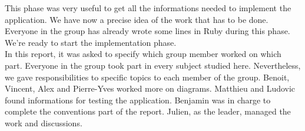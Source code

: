 This phase was very useful to get all the informations needed to implement the application. We have now a precise idea of the work that has to be done. Everyone in the group has already wrote some lines in Ruby during this phase. We're ready to start the implementation phase.\\

In this report, it was asked to specify which group member worked on which part. Everyone in the group took part in every subject studied here. Nevertheless, we gave responsibilities to specific topics to each member of the group. Benoit, Vincent, Alex and Pierre-Yves worked more on diagrams. Matthieu and Ludovic found informations for testing the application. Benjamin was in charge to complete the conventions part of the report. Julien, as the leader, managed the work and discussions. %



